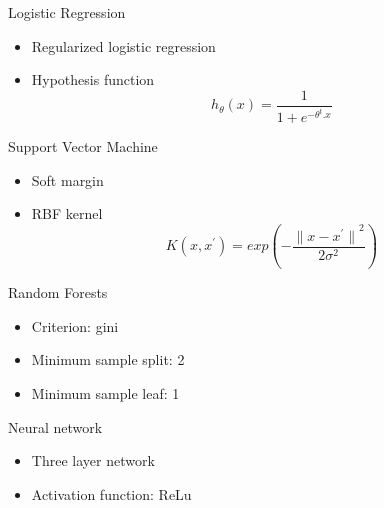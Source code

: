 \documentclass[12pt]{beamer}
\begin{document}
\begin{frame}{Logistic Regression}
    \begin{itemize}
        \item Regularized logistic regression
        \item Hypothesis function
        \begin{equation}
            \label{eq:regularized_logistic_regression}
            h_{\theta}(x) = \frac{1}{1 + {e}^{-{\theta}^{t}. x}}
        \end{equation}
    \end{itemize}
\end{frame}

\begin{frame}{Support Vector Machine}
    \begin{itemize}
        \item Soft margin
        \item RBF kernel
        \begin{equation}
            \label{eq:rbf_kernel}
            K(x, x^{'}) = exp(- \frac{{\lVert x - x^{'} \rVert}^{2}}{2 \sigma^{2}})
        \end{equation}
    \end{itemize}
\end{frame}

\begin{frame}{Random Forests}
    \begin{itemize}
        \item Criterion: gini
        \item Minimum sample split: 2
        \item Minimum sample leaf: 1
    \end{itemize}
\end{frame}

\begin{frame}{Neural network}
    \begin{itemize}
        \item Three layer network
        \item Activation function: ReLu
    \end{itemize}
\end{frame}
\end{document}
